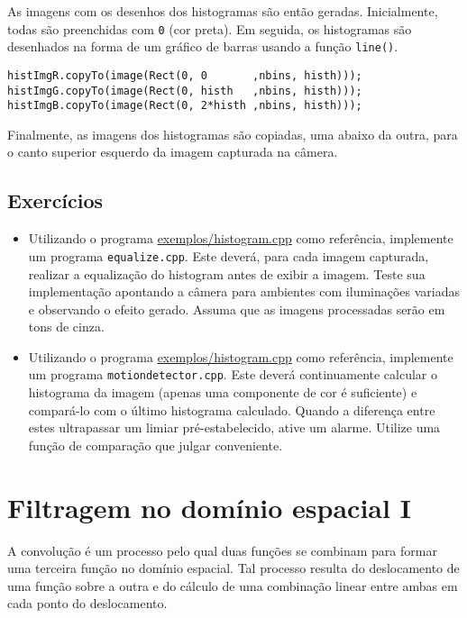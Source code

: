 \documentclass[11pt]{amsbook}
\begin{document}
As imagens com os desenhos dos histogramas são então
geradas. Inicialmente, todas são preenchidas com \texttt{0} (cor preta). Em
seguida, os histogramas são desenhados na forma de um gráfico de
barras usando a função \texttt{line()}.


\begin{verbatim}
histImgR.copyTo(image(Rect(0, 0       ,nbins, histh)));
histImgG.copyTo(image(Rect(0, histh   ,nbins, histh)));
histImgB.copyTo(image(Rect(0, 2*histh ,nbins, histh)));
\end{verbatim}

Finalmente, as imagens dos histogramas são copiadas, uma abaixo da
outra, para o canto superior esquerdo da imagem capturada na câmera.


\hypertarget{x-exercícios}{\section{Exercícios}}
\begin{itemize}

\item Utilizando o programa \href{exemplos/histogram.cpp}{exemplos/histogram.cpp} como referência,
implemente um programa \texttt{equalize.cpp}. Este deverá, para cada
imagem capturada, realizar a equalização do histogram antes de
exibir a imagem. Teste sua implementação apontando a câmera para
ambientes com iluminações variadas e observando o efeito
gerado. Assuma que as imagens processadas serão em tons de cinza.

\item Utilizando o programa \href{exemplos/histogram.cpp}{exemplos/histogram.cpp} como referência,
implemente um programa \texttt{motiondetector.cpp}. Este deverá
continuamente calcular o histograma da imagem (apenas uma componente
de cor é suficiente) e compará-lo com o último histograma
calculado. Quando a diferença entre estes ultrapassar um limiar
pré-estabelecido, ative um alarme. Utilize uma função de comparação
que julgar conveniente.

\end{itemize}


\hypertarget{x-filtragem-no-domínio-espacial-i}{\chapter{Filtragem no domínio espacial I}}
A convolução é um processo pelo qual duas funções se combinam para
formar uma terceira função no domínio espacial. Tal processo resulta
do deslocamento de uma função sobre a outra e do cálculo de uma
combinação linear entre ambas em cada ponto do deslocamento.
\end{document}
